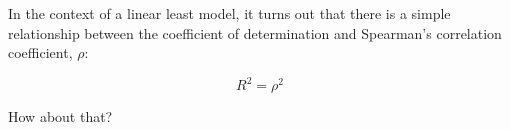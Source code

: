 \documentclass[12pt]{book}
\begin{document}
In the context of a linear least model, it turns out that there is
a simple relationship between the coefficient of determination and
Spearman's correlation coefficient, $\rho$:

\[ R^2 = \rho^2 \]

How about that?













\printindex

\clearemptydoublepage
\end{document}
